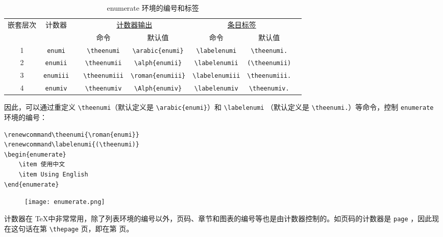 \begin{table}[H]
    \centering
    \caption{{\ttfamily enumerate} 环境的编号和标签}
    \label{tab:enum}
    \begin{tabular}{cccccccc}
        \toprule
        嵌套层次 & 计数器 && \multicolumn{2}{c}{\underline{\qquad\qquad 计数器输出\qquad\qquad}} &  \multicolumn{2}{c}{\underline{\qquad \qquad 条目标签 \qquad \qquad}}\\ 
        & && 命令 & 默认值 & 命令 & 默认值 \\
        1 & \verb|enumi| && \verb|\theenumi| & \verb|\arabic{enumi}| &  \verb|\labelenumi| & \verb|\theenumi.| \\
        2 & \verb|enumii| && \verb|\theenumii| & \verb|\alph{enumii}| &  \verb|\labelenumii| & \verb|(\theenumii)| \\
        3 & \verb|enumiii| && \verb|\theenumiii| & \verb|\roman{enumiii}| &  \verb|\labelenumiii| & \verb|\theenumiii.| \\
        4 & \verb|enumiv| && \verb|\theenumiv| & \verb|\Alph{enumiv}| &  \verb|\labelenumiv| & \verb|\theenumiv.| \\
    \bottomrule
    \end{tabular}
\end{table}

因此，可以通过重定义 \verb|\theenumi|（默认定义是 \verb|\arabic{enumi}|）和 \verb|\labelenumi| （默认定义是 \verb|\theenumi.|）等命令，控制 \verb|enumerate| 环境的编号：

\begin{minipage}[t]{0.45\textwidth}
\begin{lstlisting}
\renewcommand\theenumi{\roman{enumi}}
\renewcommand\labelenumi{(\theenumi)}
\begin{enumerate}
    \item 使用中文
    \item Using English
\end{enumerate}
\end{lstlisting}
\end{minipage}
\hfill
\begin{minipage}[t]{0.45\textwidth}
\begin{figure}[H]
    \centering
    \texttt{[image: enumerate.png]}
\end{figure}
\end{minipage}

计数器在 \TeX 中非常常用，除了列表环境的编号以外，页码、章节和图表的编号等也是由计数器控制的。如页码的计数器是 \verb|page| ，因此现在这句话在第 \verb|\thepage| 页，即在第 \thepage 页。

